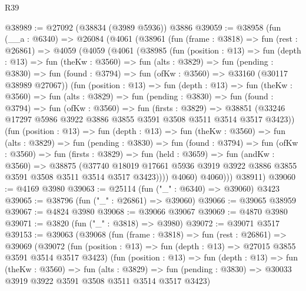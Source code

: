\begin{lexlean}{R39}
\begin{coremodule}
@38989 := @27092 (@38834 (@3989 @5936)) @3886
@39059 := @38958
    (fun (__a : @6340) =>
    @26084
      (@4061
        (@38961
          (fun (frame : @3818) =>
          fun (rest : @26861) =>
          @4059
            (@4059
              (@4061
                (@38985
                  (fun (position : @13) =>
                  fun (depth : @13) =>
                  fun (theKw : @3560) =>
                  fun (alts : @3829) =>
                  fun (pending : @3830) =>
                  fun (found : @3794) => fun (ofKw : @3560) => @33160 (@30117 @38989 @27067))
                  (fun (position : @13) =>
                  fun (depth : @13) =>
                  fun (theKw : @3560) =>
                  fun (alts : @3829) =>
                  fun (pending : @3830) =>
                  fun (found : @3794) =>
                  fun (ofKw : @3560) =>
                  fun (firsts : @3829) =>
                  @38851
                    (@33246 @17297 @5986 @3922 @3886 @3855 @3591 @3508 @3511 @3514 @3517 @3423))
                  (fun (position : @13) =>
                  fun (depth : @13) =>
                  fun (theKw : @3560) =>
                  fun (alts : @3829) =>
                  fun (pending : @3830) =>
                  fun (found : @3794) =>
                  fun (ofKw : @3560) =>
                  fun (firsts : @3829) =>
                  fun (held : @3659) =>
                  fun (andKw : @3560) =>
                  @38875
                    (@37740
                      @18019
                      @17661
                      @5936
                      @3919
                      @3922
                      @3886
                      @3855
                      @3591
                      @3508
                      @3511
                      @3514
                      @3517
                      @3423))))
              @4060)
            @4060)))
      @38911)
@39060 := @4169 @3980
@39063 := @25114 (fun ("_" : @6340) => @39060) @3423
@39065 := @38796 (fun ("_" : @26861) => @39060)
@39066 := @39065 @38959
@39067 := @4824 @3980
@39068 := @39066 @39067
@39069 := @4870 @3980
@39071 := @3820 (fun ("_" : @3818) => @3980)
@39072 := @39071 @3517
@39153 := @39063
    (@39068
      (fun (frame : @3818) =>
      fun (rest : @26861) =>
      @39069
        (@39072
          (fun (position : @13) => fun (depth : @13) => @27015 @3855 @3591 @3514 @3517 @3423)
          (fun (position : @13) =>
          fun (depth : @13) =>
          fun (theKw : @3560) =>
          fun (alts : @3829) =>
          fun (pending : @3830) => @30033 @3919 @3922 @3591 @3508 @3511 @3514 @3517 @3423)

\end{coremodule}
\end{lexlean}
